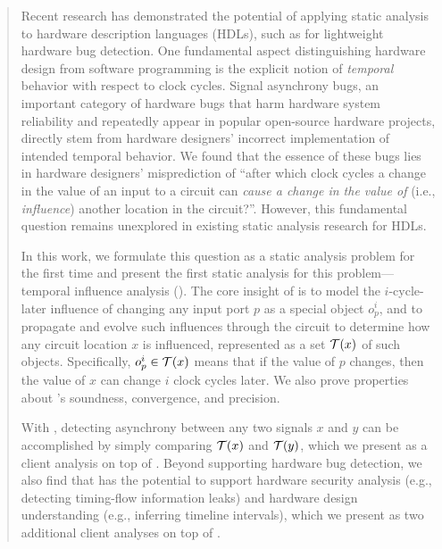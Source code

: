 \begin{abstract}
Recent research has demonstrated the potential of applying static analysis to hardware description languages (HDLs), such as for lightweight hardware bug detection.
One fundamental aspect distinguishing hardware design from software programming is the explicit notion of \emph{temporal} behavior with respect to clock cycles.
Signal asynchrony bugs, an important category of hardware bugs that harm hardware system reliability and repeatedly appear in popular open-source hardware projects, directly stem from hardware designers' incorrect implementation of intended temporal behavior.
We found that the essence of these bugs lies in hardware designers' misprediction of ``after which clock cycles a change in the value of an input to a circuit can \emph{cause a change in the value of} (i.e., \emph{influence}) another location in the circuit?''.
However, this fundamental question remains unexplored in existing static analysis research for HDLs.

In this work, we formulate this question as a static analysis problem for the first time and present the first static analysis for this problem---temporal influence analysis (\tia).
The core insight of \tia is to model the $i$-cycle-later influence of changing any input port $p$ as a special object $o_p^i$, and to propagate and evolve such influences through the circuit to determine how any circuit location $x$ is influenced, represented as a set $\absT(x)$ of such objects.
Specifically, $o_p^i \in \absT(x)$ means that if the value of $p$ changes, then the value of $x$ can change $i$ clock cycles later.
We also prove properties about \tia's soundness, convergence, and precision.

With \tia, detecting asynchrony between any two signals $x$ and $y$ can be accomplished by simply comparing $\absT(x)$ and $\absT(y)$, which we present as a client analysis on top of \tia.
Beyond supporting hardware bug detection, we also find that \tia has the potential to support hardware security analysis (e.g., detecting timing-flow information leaks) and hardware design understanding (e.g., inferring timeline intervals), which we present as two additional client analyses on top of \tia.


\end{abstract}
